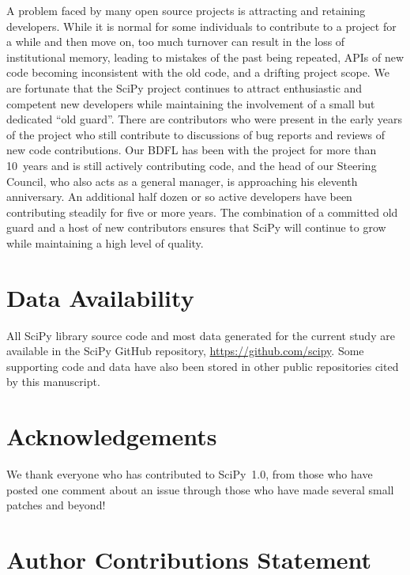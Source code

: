 \documentclass[fleqn,10pt]{wlscirep}
\begin{document}
A problem faced by many open source projects is attracting and retaining developers. While it is normal for some individuals to contribute to a project for a while and then move on, too much turnover can result in the loss of institutional memory, leading to mistakes of the past being repeated, APIs of new code becoming inconsistent with the old code, and a drifting project scope.
We are fortunate that the SciPy project continues to attract enthusiastic and competent new developers while maintaining the involvement of a small but dedicated ``old guard''. There are contributors who were present in the early years of the project who still contribute to discussions of bug reports and reviews of new code contributions. Our BDFL has been with the project for more than 10~years and is still actively contributing code, and the head of our Steering Council, who also acts as a general manager, is approaching his eleventh anniversary. An additional half dozen or so active developers have been contributing steadily for five or more years. The combination of a committed old guard and a host of new contributors ensures that SciPy will continue to grow while maintaining a high level of quality.

\section*{Data Availability}
All SciPy library source code and most data generated for the current study are available in the SciPy GitHub repository, \url{https://github.com/scipy}. Some supporting code and data have also been stored in other public repositories cited by this manuscript.



\section*{Acknowledgements}

We thank everyone who has contributed to SciPy~1.0, from those who have posted one comment about an issue through those who have made several small patches and beyond!

\section*{Author Contributions Statement}
\end{document}
